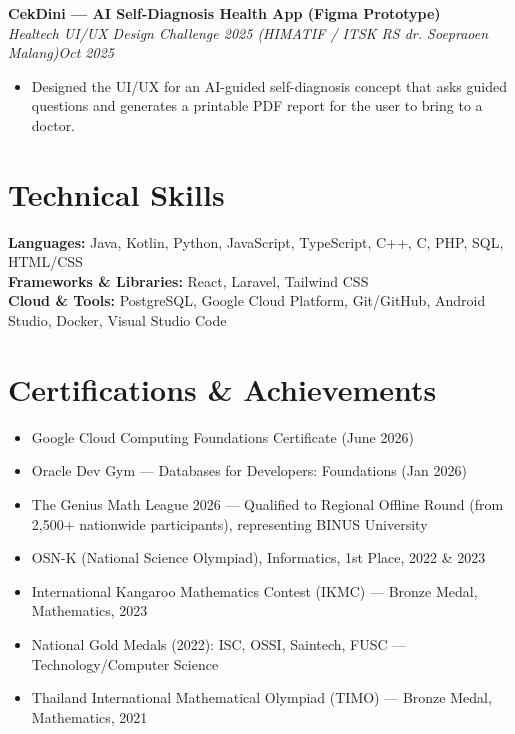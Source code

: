 \documentclass[10.5pt,a4paper]{article}
\newcommand{\cvheading}[3]{%
  \noindent\textbf{#1}\\
  \textit{#2}\hfill\textit{#3}\par
}
\begin{document}
\cvheading{CekDini --- AI Self-Diagnosis Health App (Figma Prototype)}{Healtech UI/UX Design Challenge 2025 (HIMATIF / ITSK RS dr. Soepraoen Malang)}{Oct 2025}
\begin{itemize}
  \item Designed the UI/UX for an AI-guided self-diagnosis concept that asks guided questions and generates a printable PDF report for the user to bring to a doctor.
\end{itemize}

\section*{Technical Skills}
\textbf{Languages:} Java, Kotlin, Python, JavaScript, TypeScript, C++, C, PHP, SQL, HTML/CSS \\
\textbf{Frameworks \& Libraries:} React, Laravel, Tailwind CSS \\
\textbf{Cloud \& Tools:} PostgreSQL, Google Cloud Platform, Git/GitHub, Android Studio, Docker, Visual Studio Code

\section*{Certifications \& Achievements}
\begin{itemize}
  \item Google Cloud Computing Foundations Certificate (June 2026)
  \item Oracle Dev Gym --- Databases for Developers: Foundations (Jan 2026)
  \item The Genius Math League 2026 --- Qualified to Regional Offline Round (from 2,500+ nationwide participants), representing BINUS University
  \item OSN-K (National Science Olympiad), Informatics, 1st Place, 2022 \& 2023
  \item International Kangaroo Mathematics Contest (IKMC) --- Bronze Medal, Mathematics, 2023
  \item National Gold Medals (2022): ISC, OSSI, Saintech, FUSC --- Technology/Computer Science
  \item Thailand International Mathematical Olympiad (TIMO) --- Bronze Medal, Mathematics, 2021
\end{itemize}
\end{document}

